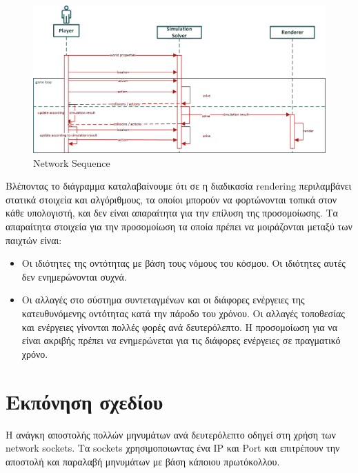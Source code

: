 		\begin{figure}[h]
			\centering
			\includegraphics[width=140mm]{Images/gameloop_network_sequence}
			\caption{Network Sequence}
			\label{fig:Network Sequence}
		\end{figure}		
		
		Βλέποντας το διάγραμμα καταλαβαίνουμε ότι σε η διαδικασία rendering περιλαμβάνει στατικά στοιχεία και αλγόριθμους, τα οποίοι μπορούν να φορτώνονται τοπικά στον κάθε υπολογιστή, και δεν είναι απαραίτητα για την επίλυση της προσομοίωσης. Τα απαραίτητα στοιχεία για την προσομοίωση τα οποία πρέπει να μοιράζονται μεταξύ των παιχτών είναι:
		\begin{itemize}
			\item Oι ιδιότητες της οντότητας με βάση τους νόμους του κόσμου. Οι ιδιότητες αυτές δεν ενημερώνονται συχνά.
			\item Οι αλλαγές στο σύστημα συντεταγμένων και οι διάφορες ενέργειες της κατευθυνόμενης οντότητας κατά την πάροδο του χρόνου. Οι αλλαγές τοποθεσίας και ενέργειες γίνονται πολλές φορές ανά δευτερόλεπτο. Η προσομοίωση για να είναι ακριβής πρέπει να ενημερώνεται για τις διάφορες ενέργειες σε πραγματικό χρόνο.
		\end{itemize}
				
		\section{Εκπόνηση σχεδίου}	
		Η ανάγκη αποστολής πολλών μηνυμάτων ανά δευτερόλεπτο οδηγεί στη χρήση των network sockets. Τα sockets χρησιμοποιωντας ένα IP και  Port και επιτρέπουν την αποστολή και παραλαβή μηνυμάτων με βάση κάποιου πρωτόκολλου.
		
